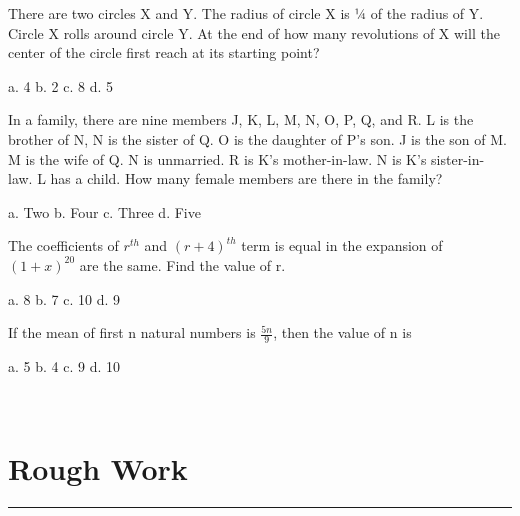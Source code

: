 \documentclass[a4paper, addpoints]{exam}
\begin{document}
\begin{questions}
	\question There are two circles X and Y. The radius of circle X is ¼ of the radius of Y. Circle X rolls around circle Y. At the end of how many revolutions of X will the center of the circle first reach at its starting point?\\
	
	\begin{oneparcheckboxes}
		\choice a. 4
		\choice b. 2
		\choice c. 8
		\choice d. 5
	\end{oneparcheckboxes}
	\question In a family, there are nine members J, K, L, M, N, O, P, Q, and R. L is the brother of N, N is the sister of Q. O is the daughter of P's son. J is the son of M. M is the wife of Q. N is unmarried. R is K's mother-in-law. N is K's sister-in- law. L has a child.
How many female members are there in the family?\\

	\begin{oneparcheckboxes}
		\choice a. Two
		\choice b. Four
		\choice c. Three
		\choice d. Five
	\end{oneparcheckboxes}
	\question The coefficients of $r^{th}$ and $(r+4)^{th}$ term is equal in the expansion of $(1+x)^{20}$ are the same. Find the value of r.\\

	\begin{oneparcheckboxes}
		\choice a. 8
		\choice b. 7
		\choice c. 10
		\choice d. 9
	\end{oneparcheckboxes}
	
	\question If the mean of first n natural numbers is $\frac{5n}{9}$, then the value of n is\\
	
	\begin{oneparcheckboxes}
		\choice a. 5
		\choice b. 4
		\choice c. 9
		\choice d. 10
	\end{oneparcheckboxes}\\
	\section*{{Rough Work}}
	\hrule
\end{questions}
\end{document}
